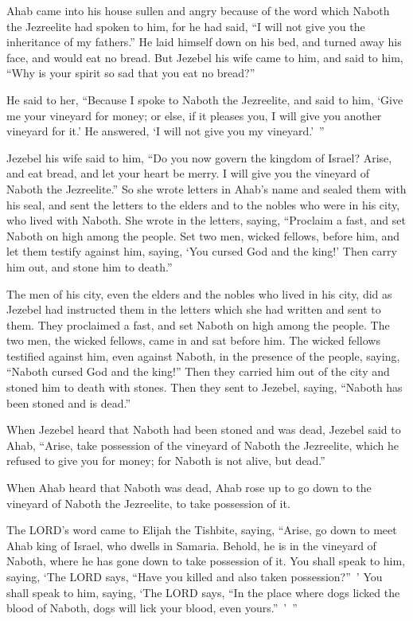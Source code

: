 \myverse{}Ahab came into his house sullen and angry because of the word
which Naboth the Jezreelite had spoken to him, for he had said, “I will not give you the inheritance of
my fathers.” He laid himself down on his bed, and turned away his face, and would eat no bread.
\myverse{}But Jezebel his wife came to him, and said to him, “Why is your spirit so sad
that you eat no bread?”

\myverse{}He said to her, “Because I spoke to Naboth the Jezreelite, and
said to him, ‘Give me your vineyard for money; or else, if it pleases you, I will give you another vineyard
for it.’ He answered, ‘I will not give you my vineyard.’ ”

\myverse{}Jezebel his wife said to him, “Do you now govern the kingdom of
Israel? Arise, and eat bread, and let your heart be merry. I will give you the vineyard of Naboth the
Jezreelite.”
\myverse{}So she wrote letters in Ahab’s name and sealed them with his seal, and sent
the letters to the elders and to the nobles who were in his city, who lived with Naboth.
\myverse{}She wrote in the letters, saying, “Proclaim a fast, and set Naboth on high
among the people.
\myverse{}Set two men, wicked fellows, before him, and let them testify against him,
saying, ‘You cursed God and the king!’ Then carry him out, and stone him to death.”

\myverse{}The men of his city, even the elders and the nobles who lived
in his city, did as Jezebel had instructed them in the letters which she had written and sent to them.
\myverse{}They proclaimed a fast, and set Naboth on high among the people.
\myverse{}The two men, the wicked fellows, came in and sat before him. The wicked fellows
testified against him, even against Naboth, in the presence of the people, saying, “Naboth cursed God
and the king!” Then they carried him out of the city and stoned him to death with stones.
\myverse{}Then they sent to Jezebel, saying, “Naboth has been stoned and is dead.”

\myverse{}When Jezebel heard that Naboth had been stoned and was dead,
Jezebel said to Ahab, “Arise, take possession of the vineyard of Naboth the Jezreelite, which he refused
to give you for money; for Naboth is not alive, but dead.”

\myverse{}When Ahab heard that Naboth was dead, Ahab rose up to go down
to the vineyard of Naboth the Jezreelite, to take possession of it.

\myverse{}The LORD’s word came to Elijah the Tishbite, saying,
\myverse{}“Arise, go down to meet Ahab king of Israel, who dwells in Samaria. Behold,
he is in the vineyard of Naboth, where he has gone down to take possession of it.
\myverse{}You shall speak to him, saying, ‘The LORD says, “Have you killed and also
taken possession?” ’ You shall speak to him, saying, ‘The LORD says, “In the place where dogs licked the
blood of Naboth, dogs will lick your blood, even yours.” ’ ”

